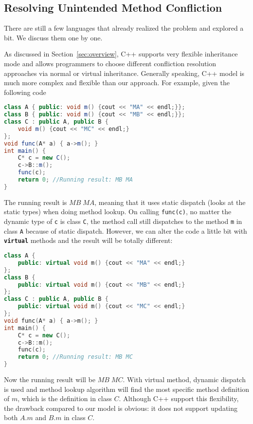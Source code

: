\subsection{Resolving Unintended Method Confliction}
There are still a few languages that already realized the problem and explored a bit. We discuss them one by one.

As discussed in Section~\ref{sec:overview}, C++ supports very flexible inheritance mode and allows programmers to choose different 
confliction resolution approaches via normal or virtual inheritance. Generally speaking, C++ model is much more complex 
and flexible than our approach. For example, given the following code
\begin{lstlisting}[language=Java]
class A { public: void m() {cout << "MA" << endl;}};
class B { public: void m() {cout << "MB" << endl;}};
class C : public A, public B { 
	void m() {cout << "MC" << endl;}
};
void func(A* a) { a->m(); }
int main() {
	C* c = new C();
	c->B::m();
	func(c); 
	return 0; //Running result: MB MA
}
\end{lstlisting}
The running result is $MB \; MA$, meaning that it uses static dispatch (looks at the static types) when doing method lookup. 
On calling \texttt{func(c)}, no matter the dynamic type of \texttt{c} is class \texttt{C}, the method call still dispatches to 
the method \texttt{m} in class \texttt{A} because of static dispatch.
However, we can alter the code a little bit with \textbf{\texttt{virtual}} methods and the result will be totally different:
\begin{lstlisting}[language=c++]
class A { 
	public: virtual void m() {cout << "MA" << endl;}
};
class B { 
	public: virtual void m() {cout << "MB" << endl;}
};
class C : public A, public B { 
    public: virtual void m() {cout << "MC" << endl;}
};
void func(A* a) { a->m(); }
int main() {
	C* c = new C();
	c->B::m();
	func(c); 
	return 0; //Running result: MB MC
}
\end{lstlisting}
Now the running result will be $MB \; MC$. With virtual method, dynamic dispatch is used and 
method lookup algorithm will find the most specific method definition of $m$, which is the definition 
in class $C$. Although C++ support this flexibility, the drawback compared to our model is
obvious: it does not support updating both $A.m$ and $B.m$ in class $C$. 

\begin{lstlisting}
\end{lstlisting}

